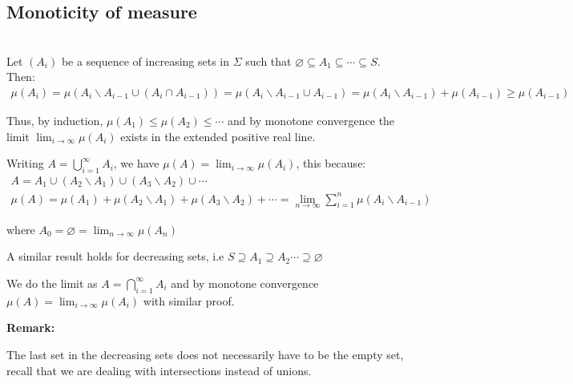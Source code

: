 \subsection{Monoticity of measure}\hfill\\
\noindent Let $(A_i)$ be a sequence of increasing sets in $\Sigma$ such that $\varnothing\subseteq A_1\subseteq\cdots\subseteq S$. Then:
\begin{equation*}
  \begin{gathered}
    \mu(A_i) = \mu(A_i\backslash A_{i-1}\cup (A_i\cap A_{i-1})) = \mu(A_i\backslash A_{i-1}\cup A_{i-1}) = \mu(A_i\backslash A_{i-1})+\mu(A_{i-1})\geq\mu(A_{i-1})
  \end{gathered}
\end{equation*}\par
\noindent Thus, by induction, $\mu(A_1)\leq\mu(A_2)\leq\cdots$ and by monotone convergence the limit $\lim_{i\to\infty}\mu(A_i)$ exists in the extended positive real line.
\par\bigskip
\noindent Writing $A = \bigcup_{i=1}^{\infty}A_i$, we have $\mu(A) = \lim_{i\to\infty}\mu(A_i)$, this because:
\begin{equation*}
  \begin{gathered}
    A = A_1\cup(A_2\backslash A_1)\cup(A_3\backslash A_2)\cup\cdots\\
    \mu(A) = \mu(A_1)+\mu(A_2\backslash A_1)+\mu(A_3\backslash A_2)+\cdots = \lim_{n\to\infty}\sum_{i=1}^{n}\mu(A_i\backslash A_{i-1})
  \end{gathered}
\end{equation*}\par
\noindent where $A_0 = \varnothing = \lim_{n\to\infty}\mu(A_n)$
\par\bigskip
\noindent A similar result holds for decreasing sets, i.e $S\supseteq A_1\supseteq A_2\cdots\supseteq \varnothing$\par
\noindent We do the limit as $A = \bigcap_{i=1}^{\infty}A_i$ and by monotone convergence $\mu(A) = \lim_{i\to\infty}\mu(A_i)$ with similar proof.
\par\bigskip
\noindent\textbf{Remark:}\par
\noindent The last set in the decreasing sets does not necessarily have to be the empty set, recall that we are dealing with intersections instead of unions.
